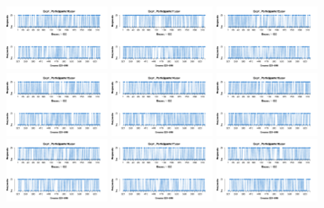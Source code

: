 \begin{figure}[th]
\includegraphics[width=0.30\textwidth]{Figures/Response_Exp1_P10} \includegraphics[width=0.30\textwidth]{Figures/Response_Exp1_P11} \includegraphics[width=0.30\textwidth]{Figures/Response_Exp1_P12}
\includegraphics[width=0.30\textwidth]{Figures/Response_Exp1_P13} \includegraphics[width=0.30\textwidth]{Figures/Response_Exp1_P14} \includegraphics[width=0.30\textwidth]{Figures/Response_Exp1_P15}
\includegraphics[width=0.30\textwidth]{Figures/Response_Exp1_P16} \includegraphics[width=0.30\textwidth]{Figures/Response_Exp1_P17} \includegraphics[width=0.30\textwidth]{Figures/Response_Exp1_P18}

\end{figure}
